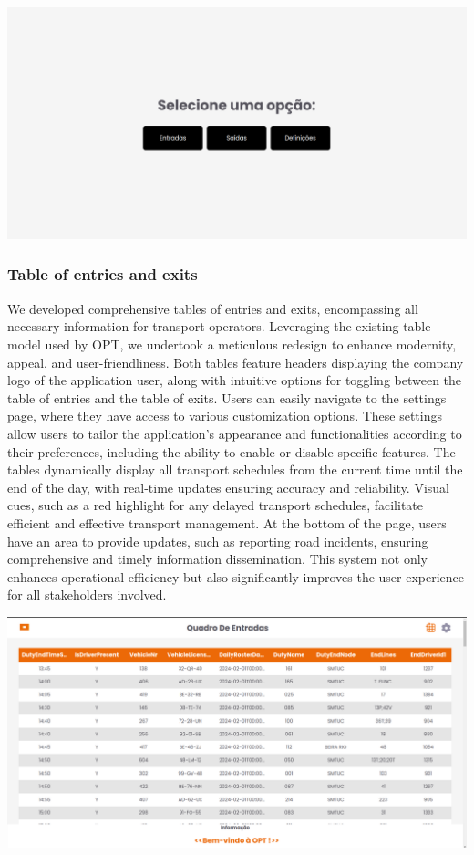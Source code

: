 \documentclass[10pt]{article}
\begin{document}
            \vfill
        \includegraphics[width=1\textwidth]{home_page}
            \vfill

        \subsubsection{Table of entries and exits}

        We developed comprehensive tables of entries and exits, encompassing all necessary information for transport operators. Leveraging the existing table model used by OPT, we undertook a meticulous redesign to enhance modernity, appeal, and user-friendliness. Both tables feature headers displaying the company logo of the application user, along with intuitive options for toggling between the table of entries and the table of exits.
        Users can easily navigate to the settings page, where they have access to various customization options. These settings allow users to tailor the application's appearance and functionalities according to their preferences, including the ability to enable or disable specific features.
        The tables dynamically display all transport schedules from the current time until the end of the day, with real-time updates ensuring accuracy and reliability. Visual cues, such as a red highlight for any delayed transport schedules, facilitate efficient and effective transport management. At the bottom of the page, users have an area to provide updates, such as reporting road incidents, ensuring comprehensive and timely information dissemination.
        This system not only enhances operational efficiency but also significantly improves the user experience for all stakeholders involved.

            \vfill
        \includegraphics[width=1\textwidth]{table_of_entries}
\end{document}
